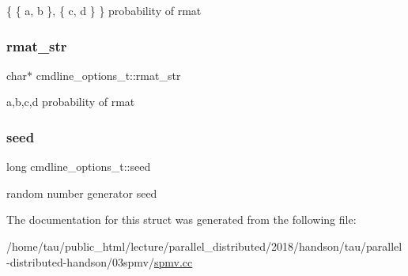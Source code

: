 \{ \{ a, b \}, \{ c, d \} \} probability of rmat \mbox{\label{structcmdline__options__t_a4ae2cfd5fda7a25e302fff37c1201f93}} 
\subsubsection{\texorpdfstring{rmat\+\_\+str}{rmat\_str}}
{\footnotesize\ttfamily char$\ast$ cmdline\+\_\+options\+\_\+t\+::rmat\+\_\+str}

a,b,c,d probability of rmat \mbox{\label{structcmdline__options__t_a065412d7cdc54cdae630389c3fda266e}} 
\subsubsection{\texorpdfstring{seed}{seed}}
{\footnotesize\ttfamily long cmdline\+\_\+options\+\_\+t\+::seed}

random number generator seed 

The documentation for this struct was generated from the following file\+:\begin{DoxyCompactItemize}
\item 
/home/tau/public\+\_\+html/lecture/parallel\+\_\+distributed/2018/handson/tau/parallel-\/distributed-\/handson/03spmv/\hyperlink{spmv_8cc}{spmv.\+cc}\end{DoxyCompactItemize}
